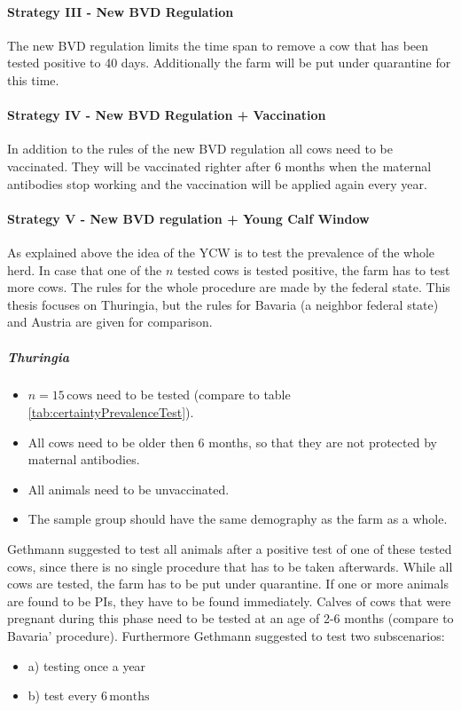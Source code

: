 \paragraph{Strategy III - New BVD Regulation}
The new BVD regulation limits the time span to remove a cow that has been tested positive to 40 days. Additionally the farm will be put under quarantine for this time. 
\paragraph{Strategy IV - New BVD Regulation + Vaccination}
In addition to the rules of the new BVD regulation all cows need to be vaccinated. They will be vaccinated righter after 6 months when the maternal antibodies stop working and the vaccination will be applied again every year. 
\paragraph{Strategy V - New BVD regulation + Young Calf Window}
As explained above the idea of the YCW is to test the prevalence of the whole herd. In case that one of the $n$ tested cows is tested positive, the farm has to test more cows. The rules for the whole procedure are made by the federal state. This thesis focuses on Thuringia, but the rules for Bavaria (a neighbor federal state) and Austria are given for comparison.
\subparagraph{Thuringia}
\begin{itemize}
\item $n = 15\,\text{cows}$ need to be tested (compare to table \ref{tab:certaintyPrevalenceTest}).
\item All cows need to be older then 6 months, so that they are not protected by maternal antibodies.
\item All animals need to be unvaccinated.
\item The sample group should have the same demography as the farm as a whole.
\end{itemize}
Gethmann suggested to test all animals after a positive test of one of these tested cows, since there is no single procedure that has to be taken afterwards. While all cows are tested, the farm has to be put under quarantine. If one or more animals are found to be PIs, they have to be found immediately. Calves of cows that were pregnant during this phase need to be tested at an age of 2-6 months (compare to Bavaria' procedure). Furthermore Gethmann suggested to test two subscenarios:
\begin{itemize}
\item a) testing once a year
\item b) test every $6\,\text{months}$
\end{itemize}

